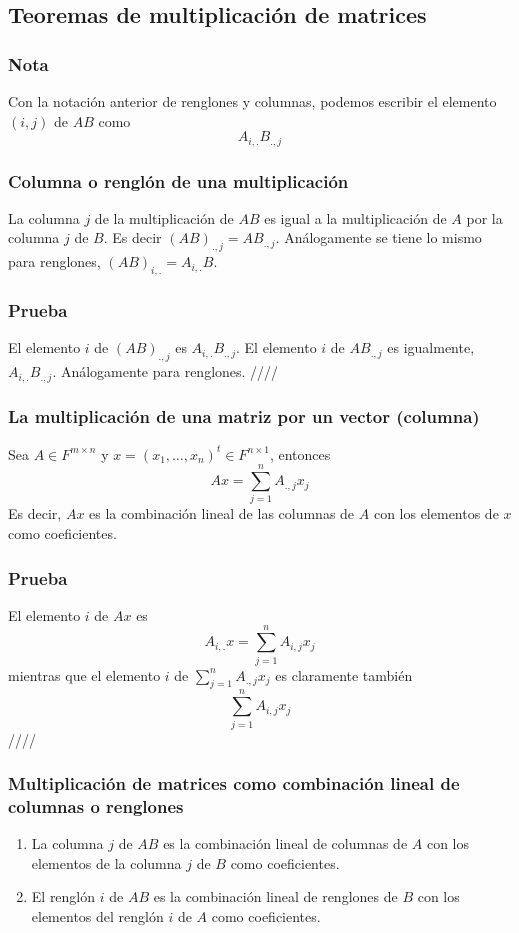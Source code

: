 \documentclass{article}
\begin{document}
\subsection{Teoremas de multiplicación de matrices}
\subsubsection*{Nota}
Con la notación anterior de renglones y columnas, podemos
escribir el elemento $(i,j)$ de $AB$ como
$$A_{i,.} B_{.,j}$$

\subsubsection{Columna o renglón de una multiplicación}
La columna $j$ de la multiplicación de $AB$ es igual a la
multiplicación de $A$ por la columna $j$ de $B$. Es decir
$(AB)_{.,j} = A B_{.,j}$. Análogamente se tiene lo mismo para renglones,
$(AB)_{i,.} = A_{i,.} B$.

\subsubsection*{Prueba}
El elemento $i$ de $(AB)_{.,j}$ es $A_{i,.} B_{.,j}$.
El elemento $i$ de $AB_{.,j}$ es igualmente, $A_{i,.}B_{.,j}$.
Análogamente para renglones. \hfill ////

\subsubsection{La multiplicación de una matriz por un vector (columna)}
Sea $A\in F^{m\times n}$ y $x=(x_1,\ldots,x_n)^t\in F^{n\times 1}$,
entonces
$$Ax=\sum^n_{j=1}A_{.,j} x_j$$
Es decir, $Ax$ es la combinación lineal de las columnas de $A$
con los elementos de $x$ como coeficientes.
\subsubsection*{Prueba}
El elemento $i$ de $Ax$ es
$$A_{i,.}x=\sum^n_{j=1}A_{i,j}x_j$$
mientras que el elemento $i$ de $\sum^n_{j=1}A_{.,j} x_j$
es claramente también
$$\sum^n_{j=1}A_{i,j} x_j$$
\hfill ////

\subsubsection{Multiplicación de matrices como combinación lineal
de columnas o renglones}
\begin{enumerate}
    \item La columna $j$ de $AB$ es la combinación lineal de columnas
    de $A$ con los elementos de la columna $j$ de $B$ como coeficientes.
    \item El renglón $i$ de $AB$ es la combinación lineal de renglones
    de $B$ con los elementos del renglón $i$ de $A$ como coeficientes.
\end{enumerate}
\end{document}

